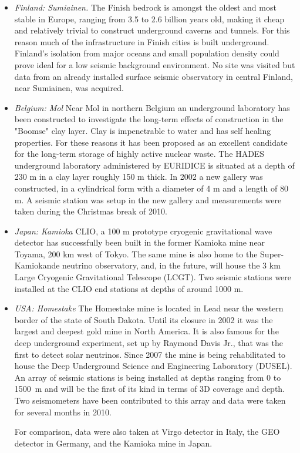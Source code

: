 \begin{itemize}
\item \emph{Finland: Sumiainen.}
The Finish bedrock is amongst the oldest and most stable in Europe, ranging from 3.5 to 2.6 billion years old, making it cheap and relatively trivial to construct underground caverns and tunnels. For this reason much of the infrastructure in Finish cities is built underground. Finland's isolation from major oceans and small population density could prove ideal for a low seismic background environment. No site was visited but data from an already installed surface seismic observatory in central Finland, near Sumiainen, was acquired.

\item \emph{Belgium: Mol}
Near Mol in northern Belgium an underground laboratory has been constructed to investigate the long-term effects of construction in the "Boomse" clay layer. Clay is impenetrable to water and has self healing properties. For these reasons it has been proposed as an excellent candidate for the long-term storage of highly active nuclear waste. The HADES underground laboratory administered by EURIDICE is situated at a depth of 230 m in a clay layer roughly 150 m thick. In 2002 a new gallery was constructed, in a cylindrical form with a diameter of 4 m and a length of 80 m. A seismic station was setup in the new gallery and measurements were taken during the Christmas break of 2010.

\item \emph{Japan: Kamioka}
CLIO, a 100 m prototype cryogenic gravitational wave detector has successfully been built in the former Kamioka mine near Toyama, 200 km west of Tokyo. The same mine is also home to the Super-Kamiokande neutrino observatory, and, in the future, will house the 3 km Large Cryogenic Gravitational Telescope (LCGT). Two seismic stations were installed at the CLIO end stations at depths of around 1000 m.

\item \emph{USA: Homestake}
The Homestake mine is located in Lead near the western border of the state of South Dakota. Until its closure in 2002 it was the largest and deepest gold mine in North America. It is also famous for the deep underground experiment, set up by Raymond Davis Jr., that was the first to detect solar neutrinos. Since 2007 the mine is being rehabilitated to house the Deep Underground Science and Engineering Laboratory (DUSEL). An array of seismic stations is being installed at depths ranging from 0 to 1500~m and will be the first of its kind in terms of 3D coverage and depth. Two seismometers have been contributed to this array and data were taken for several months in 2010.

For comparison, data were also taken at Virgo detector in Italy, the GEO detector in Germany, and the Kamioka mine in Japan.

\end{itemize}


